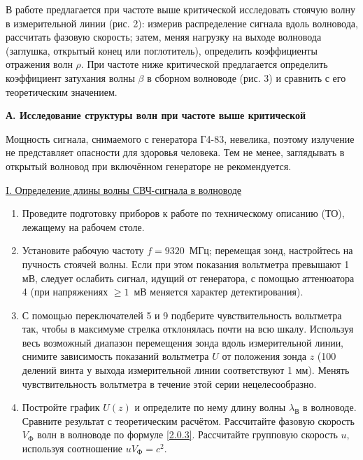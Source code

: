 \begin{lab:task}

В работе предлагается при частоте выше критической исследовать стоячую волну в измерительной линии (рис. 2): измерив распределение сигнала вдоль волновода, рассчитать фазовую скорость; затем, меняя нагрузку на выходе волновода (заглушка, открытый конец или поглотитель), определить коэффициенты отражения волн $\rho.$ При частоте ниже критической предлагается определить коэффициент затухания волны $\beta$ в сборном волноводе (рис. 3) и сравнить с его теоретическим значением.

\begin{center}
	\textbf{А. Исследование структуры волн при частоте выше 
		критической}
\end{center}

Мощность сигнала, снимаемого с генератора Г4-83, невелика, поэтому излучение не представляет опасности для здоровья человека. Тем не менее, заглядывать в открытый волновод при включённом генераторе не рекомендуется.

\begin{center}
\underline{I. Определение длины волны СВЧ-сигнала в волноводе}
\end{center}

\begin{enumerate}

	\item Проведите подготовку приборов к работе по техническому описанию (ТО), лежащему на рабочем столе.
	
	\item Установите рабочую частоту $f=9320$~МГц; перемещая зонд, настройтесь на пучность стоячей волны. Если при этом показания вольтметра превышают 1 мВ, следует ослабить сигнал, идущий от генератора, с помощью аттенюатора 4 (при напряжениях $\ge1$~мВ меняется характер детектирования).
	
	\item С помощью переключателей 5 и 9 подберите чувствительность вольтметра так, чтобы в максимуме стрелка отклонялась почти на всю шкалу. Используя весь возможный диапазон перемещения зонда вдоль измерительной линии, снимите зависимость показаний вольтметра $U$ от положения зонда $z$ (100 делений винта у выхода измерительной линии соответствуют 1 мм). Менять чувствительность вольтметра в течение этой серии нецелесообразно.
	
	\item Постройте график $U(z)$ и определите по нему длину волны $\lambda_{\text{В}}$ в волноводе. Сравните результат с теоретическим расчётом. Рассчитайте фазовую скорость $V_{\text{Ф}}$ волн в волноводе по формуле \eqref{2.0.3}. Рассчитайте групповую скорость $u,$ используя соотношение $uV_{\text{Ф}}=c^2.$	



\end{enumerate}
\end{lab:task}
